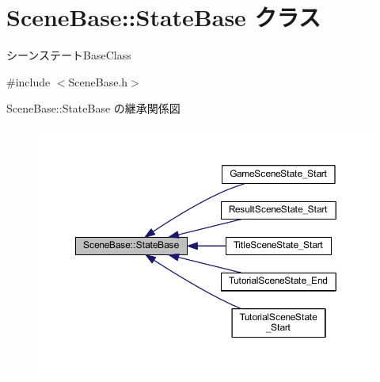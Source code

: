 \hypertarget{class_scene_base_1_1_state_base}{}\section{Scene\+Base\+:\+:State\+Base クラス}
\label{class_scene_base_1_1_state_base}


シーンステート\+Base\+Class  




{\ttfamily \#include $<$Scene\+Base.\+h$>$}



Scene\+Base\+:\+:State\+Base の継承関係図\nopagebreak
\begin{figure}[H]
\begin{center}
\leavevmode
\includegraphics[width=350pt]{class_scene_base_1_1_state_base__inherit__graph}
\end{center}
\end{figure}
